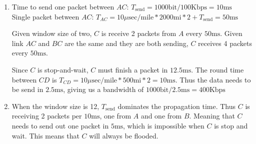 \begin{enumerate}
    \item  Time to send one packet between $AC$: $T_{\text{send}} = 1000 \text{bit} / 100 \text{Kbps} = 10 \text{ms}$
          Single packet between $AC$:
          $T_{AC} = 10 \mu \text{sec/mile} * 2000 \text{mi} * 2 + T_{\text{send}} = 50 \text{ms}$

          Given window size of two, $C$ is receive 2 packets from $A$ every $50 \text{ms}$.
          Given link $AC$ and $BC$ are the same and they are both sending, $C$ receives 4 packets every $50 \text{ms}$.

          Since $C$ is stop-and-wait, $C$ must finish a packet in $12.5 \text{ms}$.
          The round time between $CD$ is $T_{CD} = 10 \mu \text{sec/mile} * 500 \text{mi} * 2 = 10 \text{ms}$.
          Thus the data needs to be send in $2.5 \text{ms}$, giving us a bandwidth of $1000 \text{bit} / 2.5 \text{ms} = 400 \text{Kbps}$

    \item When the window size is 12, $T_{\text{send}}$ dominates the propagation time.
          Thus $C$ is receiving 2 packets per $10 \text{ms}$, one from $A$ and one from $B$.
          Meaning that $C$ needs to send out one packet in $5 \text{ms}$, which is impossible when $C$ is stop and wait.
          This means that $C$ will always be flooded.
\end{enumerate}